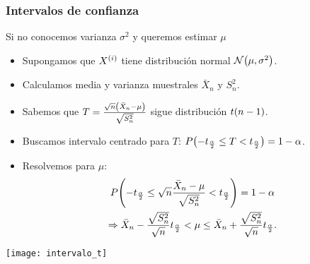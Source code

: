 \documentclass[table]{beamer}
\begin{document}
\begin{frame}
    \frametitle{Intervalos de confianza}
    \begin{block}{Si no conocemos varianza $\sigma^{2}$ y queremos estimar $\mu$}
        \begin{itemize}
            \item Supongamos que $X^{\parens{i}}$ tiene distribución normal $\normal{\mu}{\sigma^{2}}$.
            \item Calculamos media y varianza muestrales $\bar{X}_{n}$ y $S^{2}_{n}$.
            \item Sabemos que $T = \frac{\sqrt{n} \parens{\bar{X}_{n} - \mu}}{\sqrt{S^{2}_{n}}}$ sigue distribución $\tdist{n - 1}$.
            \item Buscamos intervalo centrado para $T$: $\prob{-t_{\frac{\alpha}{2}} \leq T < t_{\frac{\alpha}{2}}} = 1 - \alpha$.
            \item Resolvemos para $\mu$:
                \begin{multline*}
                    \prob{- t_{\frac{\alpha}{2}} \leq \sqrt{n} \frac{\bar{X}_{n} - \mu}{\sqrt{S^{2}_{n}}} < t_{\frac{\alpha}{2}}}
                    = 1 - \alpha
                    \\
                    \Rightarrow
                    \bar{X}_{n} - \frac{\sqrt{S^{2}_{n}}}{\sqrt{n}} t_{\frac{\alpha}{2}} < \mu \leq \bar{X}_{n} + \frac{\sqrt{S^{2}_{n}}}{\sqrt{n}} t_{\frac{\alpha}{2}}
                    .
                \end{multline*}
        \end{itemize}
    \end{block}
    \begin{center}
        \texttt{[image: intervalo\_t]}
    \end{center}
\end{frame}
\end{document}
